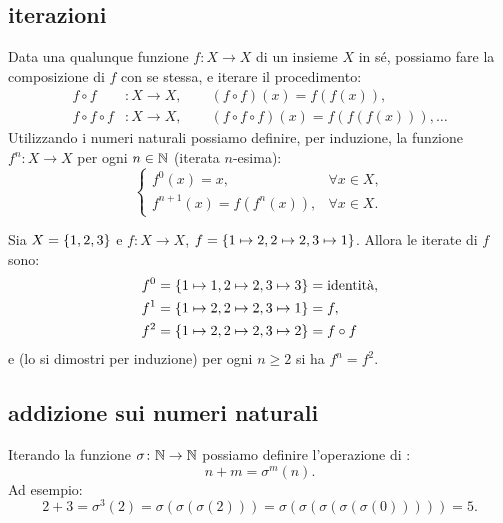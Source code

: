 \subsection{iterazioni}
%
%
%
Data una qualunque funzione $f\colon X \to X$ di un insieme $X$ in sé, 
possiamo fare la composizione di $f$ con se stessa, e iterare il procedimento: 
\begin{align*}
  f\circ f &\colon X\to X, 
    \qquad (f\circ f)(x) = f(f(x)),\\ 
  f\circ f \circ f&\colon X\to X,
    \qquad(f\circ f \circ f) (x) = f(f(f(x))), \dots   
\end{align*}
Utilizzando i numeri naturali possiamo definire, per induzione, 
la funzione $f^n\colon X\to X$ per ogni $n\in {\mathbb N}$ 
(iterata $n$-esima):
\[
\begin{cases}
  f^0(x) =  x, &\forall x\in X,\\
  f^{n+1}(x) = f(f^n(x)), &\forall x\in X.
\end{cases}  
\]
%
\begin{example}
Sia $X={\left\{ 1,2,3 \right\}}$ e $f\colon X\to X$, $f = {\left\{ 1\mapsto 2, 2 \mapsto 2, 3\mapsto 1 \right\}}$.
Allora le iterate di $f$ sono:
\begin{align*}
  f^0 &= {\left\{ 1\mapsto 1, 2\mapsto 2, 3\mapsto 3 \right\}} = \text{identità}, \\
  f^1 &= {\left\{ 1\mapsto 2, 2 \mapsto 2, 3\mapsto 1 \right\}} = f,\\
  f^2 &= {\left\{ 1\mapsto 2, 2\mapsto 2, 3\mapsto 2 \right\}} = f\circ f
\end{align*}
e (lo si dimostri per induzione) per ogni $n\ge 2$ si ha $f^n = f^2$.
\end{example}
%
\subsection{addizione sui numeri naturali}

Iterando la funzione $\sigma\colon {\mathbb N} \to {\mathbb N}$ possiamo definire 
l'operazione di :
\[
  n + m = \sigma^m(n).  
\]
Ad esempio:
\[
  2 + 3 = \sigma^3(2) = \sigma(\sigma(\sigma(2))) = \sigma(\sigma(\sigma(\sigma(\sigma(0))))) = 5.
\]

